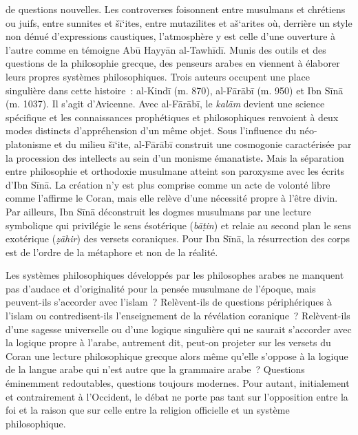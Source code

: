 de questions nouvelles. Les controverses foisonnent entre musulmans et
chrétiens ou juifs, entre sunnites et šī`ites, entre mutazilites et
aš`arites où, derrière un style non dénué d'expressions caustiques,
l'atmosphère y est celle d'une ouverture à l'autre comme en témoigne Abū
Hayyān al-Tawhīdī.
Munis des outils et des questions de la philosophie grecque, des
penseurs arabes en viennent à élaborer leurs propres systèmes
philosophiques. Trois auteurs occupent une place singulière dans cette
histoire~: al-Kindī (m. 870), al-Fārābī (m. 950) et Ibn Sīnā (m. 1037).
Il s'agit d'Avicenne. Avec al-Fārābī, le \emph{kalām} devient une
science spécifique et les connaissances prophétiques et philosophiques
renvoient à deux modes distincts d'appréhension d'un même objet. Sous
l'influence du néo-platonisme et du milieu šī`ite, al-Fārābī construit
une cosmogonie caractérisée par la procession des intellects au sein
d'un monisme émanatiste\textbf{.} Mais la séparation entre philosophie
et orthodoxie musulmane atteint son paroxysme avec les écrits d'Ibn
Sīnā. La création n'y est plus comprise comme un acte de volonté libre
comme l'affirme le Coran, mais elle relève d'une nécessité propre à
l'être divin. Par ailleurs, Ibn Sīnā déconstruit les dogmes musulmans
par une lecture symbolique qui privilégie le sens ésotérique
(\emph{bāṭin}) et relaie au second plan le sens exotérique
(\emph{ẓāhir}) des versets coraniques. Pour Ibn Sīnā, la résurrection
des corps est de l'ordre de la métaphore et non de la
réalité.

Les systèmes philosophiques développés par les philosophes arabes ne
manquent pas d'audace et d'originalité pour la pensée musulmane de
l'époque, mais peuvent-ils s'accorder avec l'islam~? Relèvent-ils de
questions périphériques à l'islam ou contredisent-ils l'enseignement de
la révélation coranique~? Relèvent-ils d'une sagesse universelle ou
d'une logique singulière qui ne saurait s'accorder avec la logique
propre à l'arabe, autrement dit, peut-on projeter sur les versets du
Coran une lecture philosophique grecque alors même qu'elle s'oppose à la
logique de la langue arabe qui n'est autre que la grammaire
arabe~? Questions éminemment redoutables, questions toujours
modernes. Pour autant, initialement et contrairement à l'Occident, le
débat ne porte pas tant sur l'opposition entre la foi et la raison que
sur celle entre la religion officielle et un système philosophique.


